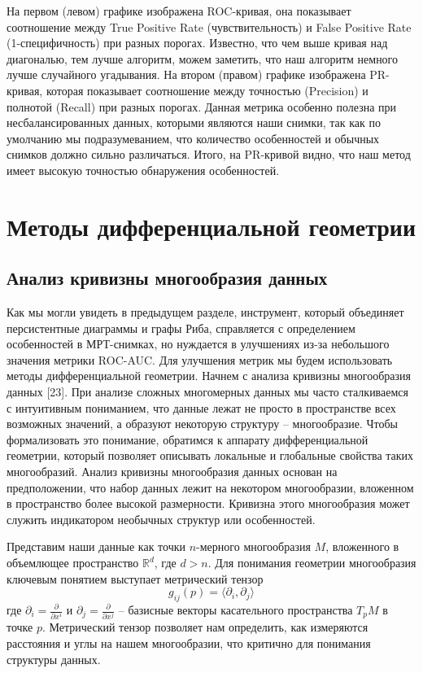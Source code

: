 \documentclass[a4paper,12pt]{extarticle}
\begin{document}
На первом (левом) графике изображена ROC-кривая, она показывает соотношение между True Positive Rate (чувствительность) и False Positive Rate (1-специфичность) при разных порогах. Известно, что чем выше кривая над диагональю, тем лучше алгоритм, можем заметить, что наш алгоритм немного лучше случайного угадывания. На втором (правом) графике изображена PR-кривая, которая показывает соотношение между точностью (Precision) и полнотой (Recall) при разных порогах. Данная метрика особенно полезна при несбалансированных данных, которыми являются наши снимки, так как по умолчанию мы подразумеванием, что количество особенностей и обычных снимков должно сильно различаться. Итого, на PR-кривой видно, что наш метод имеет высокую точностью обнаружения особенностей.

\section{Методы дифференциальной геометрии}

\subsection{Анализ кривизны многообразия данных}

Как мы могли увидеть в предыдущем разделе, инструмент, который объединяет персистентные диаграммы и графы Риба, справляется с определением особенностей в МРТ-снимках, но нуждается в улучшениях из-за небольшого значения метрики ROC-AUC. Для улучшения метрик мы будем использовать методы дифференциальной геометрии. Начнем с анализа кривизны многообразия данных [23]. При анализе сложных многомерных данных мы часто сталкиваемся с интуитивным пониманием, что данные лежат не просто в пространстве всех возможных значений, а образуют некоторую структуру -- многообразие. Чтобы формализовать это понимание, обратимся к аппарату дифференциальной геометрии, который позволяет описывать локальные и глобальные свойства таких многообразий. Анализ кривизны многообразия данных основан на предположении, что набор данных лежит на некотором многообразии, вложенном в пространство более высокой размерности. Кривизна этого многообразия может служить индикатором необычных структур или особенностей.

Представим наши данные как точки $n$-мерного многообразия $M$, вложенного в объемлющее пространство $\mathbb{R}^d$, где $d > n$. Для понимания геометрии многообразия ключевым понятием выступает метрический тензор \begin{equation}g_{ij}(p) = \langle \partial_i, \partial_j \rangle\end{equation} где $\partial_i = \frac{\partial}{\partial x^i}$ и $\partial_j = \frac{\partial}{\partial x^j}$ -- базисные векторы касательного пространства $T_p M$ в точке $p$. Метрический тензор позволяет нам определить, как измеряются расстояния и углы на нашем многообразии, что критично для понимания структуры данных.
\end{document}
